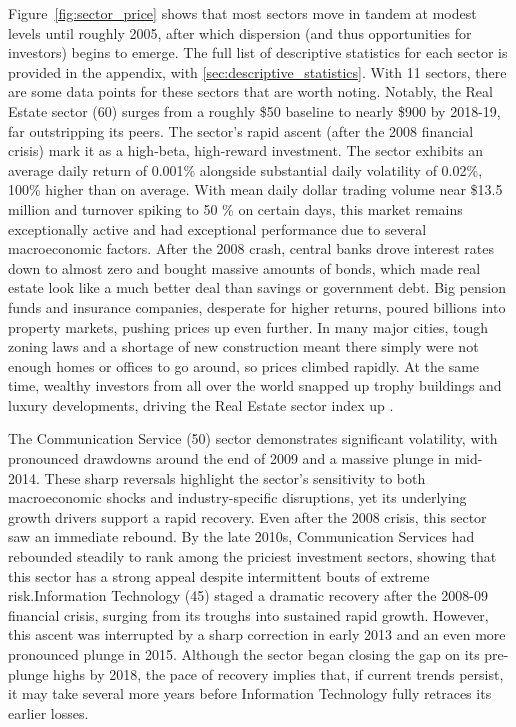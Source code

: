 Figure~\ref{fig:sector_price} shows that most sectors move in tandem at modest levels until roughly 2005, after which dispersion (and thus opportunities for investors) begins to emerge. The full list of descriptive statistics for each sector is provided in the appendix, with \cref{sec:descriptive_statistics}. With 11 sectors, there are some data points for these sectors that are worth noting. Notably, the Real Estate sector (60) surges from a roughly \$50 baseline to nearly \$900 by 2018-19, far outstripping its peers. The sector's rapid ascent (after the 2008 financial crisis) mark it as a high-beta, high-reward investment. The sector exhibits an average daily return of 0.001\% alongside substantial daily volatility of 0.02\%, 100\% higher than on average. With mean daily dollar trading volume near \$13.5 million and turnover spiking to 50 \% on certain days, this market remains exceptionally active and had exceptional performance due to several macroeconomic factors. After the 2008 crash, central banks drove interest rates down to almost zero and bought massive amounts of bonds, which made real estate look like a much better deal than savings or government debt. Big pension funds and insurance companies, desperate for higher returns, poured billions into property markets, pushing prices up even further. In many major cities, tough zoning laws and a shortage of new construction meant there simply were not enough homes or offices to go around, so prices climbed rapidly. At the same time, wealthy investors from all over the world snapped up trophy buildings and luxury developments, driving the Real Estate sector index up \cite{cbre_2018}. %

The Communication Service (50) sector demonstrates significant volatility, with pronounced drawdowns around the end of 2009 and a massive plunge in mid-2014. These sharp reversals highlight the sector's sensitivity to both macroeconomic shocks and industry-specific disruptions, yet its underlying growth drivers support a rapid recovery. Even after the 2008 crisis, this sector saw an immediate rebound. By the late 2010s, Communication Services had rebounded steadily to rank among the priciest investment sectors, showing that this sector has a strong appeal despite intermittent bouts of extreme risk.Information Technology (45) staged a dramatic recovery after the 2008-09 financial crisis, surging from its troughs into sustained rapid growth. However, this ascent was interrupted by a sharp correction in early 2013 and an even more pronounced plunge in 2015. Although the sector began closing the gap on its pre-plunge highs by 2018, the pace of recovery implies that, if current trends persist, it may take several more years before Information Technology fully retraces its earlier losses.

